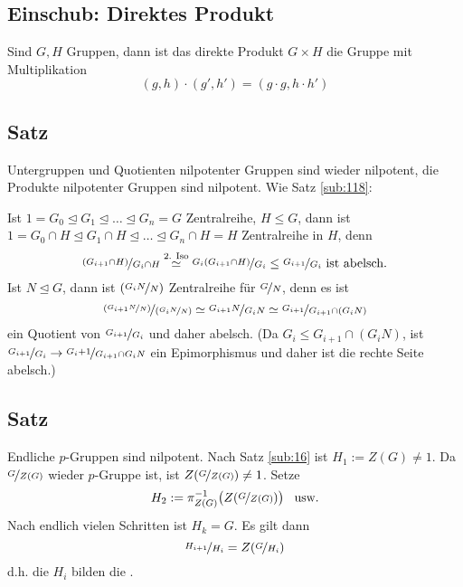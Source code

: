 \subsection*{Einschub: Direktes Produkt} %
\label{sub:einschub_direktes_produkt}
Sind $G, H$ Gruppen, dann ist das direkte Produkt $G \times H$ die Gruppe mit Multiplikation
\[
	(g,h) \cdot (g', h') = (g \cdot g, h \cdot h')
\] 

\subsection[Satz: Untergruppen und Quotienten nilpotenter Gruppen]{Satz} %
\label{sub:121}
Untergruppen und Quotienten nilpotenter Gruppen sind wieder nilpotent, die Produkte nilpotenter Gruppen sind nilpotent.
Wie Satz \ref{sub:118}: 

Ist $1 = G_0 \unlhd G_1 \unlhd \ldots \unlhd G_n  = G$ Zentralreihe, $H \le G$, dann ist $1 = G_0 \cap H \unlhd G_1 \cap H \unlhd \ldots  \unlhd G_n \cap H = H$
Zentralreihe in $H$, denn 
\[
	\nicefrac{(G_{i+1} \cap H)}{G_i \cap H} \stackrel{\text{2. Iso}}{\simeq} \nicefrac{G_i (G_{i+1} \cap H)}{G_i} \le \nicefrac{G_{i+1}}{G_i} \text{ ist abelsch.}
\]
Ist $N \unlhd G$, dann ist $(\nicefrac{G_i N}{N})$ Zentralreihe für $\nicefrac{G}{N}$, denn es ist 
\[
	\nicefrac{(\nicefrac{G_{i+1}N}{N})}{(\nicefrac{G_i N}{N})} \simeq \nicefrac{G_{i+1 }N}{G_i N} \simeq \nicefrac{G_{i+1}}{G_{i+1} \cap (G_i N)}
\]
ein Quotient von $\nicefrac{G_{i+1}}{G_i}$ und daher abelsch. (Da $G_i \le G_{i+1} \cap (G_i N)$, ist $\nicefrac{G_{i+1}}{G_i} \to \nicefrac{G_i+1}{ G_{i+1} \cap G_i N}$
ein Epimorphismus und daher ist die rechte Seite abelsch.) \bewende

\subsection[Satz: Endliche $p$-Gruppen sind nilpotent]{Satz} %
\label{sub:122}
Endliche $p$-Gruppen sind nilpotent.
Nach Satz \ref{sub:16} ist $H_1 := Z(G) \not= 1$. Da $\nicefrac{G}{Z(G)}$ wieder $p$-Gruppe ist, ist $Z(\nicefrac{G}{Z(G)}) \not= 1$. Setze 
\[
	H_2 := \pi_{Z(G)} ^{-1} \enbrace[\big]{Z (\nicefrac{G}{Z(G)})}  \enspace \text{ usw.}
\]
Nach endlich vielen Schritten ist $H_k=G$. Es gilt dann 
\[
	\nicefrac{H_{i+1}}{H_i} = Z(\nicefrac{G}{H_i})
\]
d.h. die $H_i$ bilden die . 

